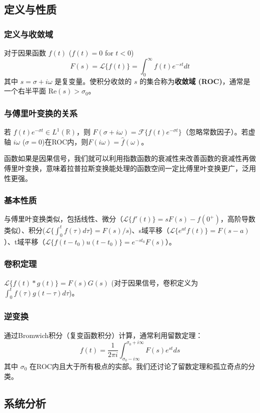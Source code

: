 \documentclass[UTF8]{ctexart}
\begin{document}
	\subsection{定义与性质}
	\subsubsection{定义与收敛域}
	对于因果函数 $f(t)$ ($f(t)=0$ for $t<0$)
	\[ F(s) = \mathcal{L}\{f(t)\} = \int_0^{\infty} f(t) e^{-st} dt \]
	其中 $s = \sigma + i\omega$ 是复变量。使积分收敛的 $s$ 的集合称为\textbf{收敛域 (ROC)}，通常是一个右半平面 $\text{Re}(s) > \sigma_0$。
	
	\subsubsection{与傅里叶变换的关系}
	若 $f(t)e^{-\sigma t} \in L^1(\mathbb{R})$，则 $F(\sigma+i\omega) = \mathcal{F}\{f(t)e^{-\sigma t}\}$（忽略常数因子）。若虚轴 $i\omega$ ($\sigma=0$)在ROC内，则$F(i\omega) = \hat{f}(\omega)$。
	
	函数如果是因果信号，我们就可以利用指数函数的衰减性来改善函数的衰减性再做傅里叶变换，意味着拉普拉斯变换能处理的函数空间一定比傅里叶变换更广，泛用性更强。
	
	\subsubsection{基本性质}
	与傅里叶变换类似，包括线性、微分（$\mathcal{L}\{f'(t)\} = sF(s) - f(0^+)$，高阶导数类似）、积分($\mathcal{L}\{\int_0^t f(\tau)d\tau\} = F(s)/s$)、s域平移（$\mathcal{L}\{e^{at}f(t)\} = F(s-a)$）、t域平移（$\mathcal{L}\{f(t-t_0)u(t-t_0)\} = e^{-st_0}F(s)$）。
	
	\subsubsection{卷积定理}
	$\mathcal{L}\{f(t) * g(t)\} = F(s)G(s)$ (对于因果信号，卷积定义为 $\int_0^t f(\tau)g(t-\tau)d\tau$)。
	
	\subsubsection{逆变换}
	通过Bromwich积分（复变函数积分）计算，通常利用留数定理：
	\[ f(t) = \frac{1}{2\pi i} \int_{\sigma_0-i\infty}^{\sigma_0+i\infty} F(s) e^{st} ds \]
	其中 $\sigma_0$ 在ROC内且大于所有极点的实部。我们还讨论了留数定理和孤立奇点的分类。
	
	\subsection{系统分析}
\end{document}
